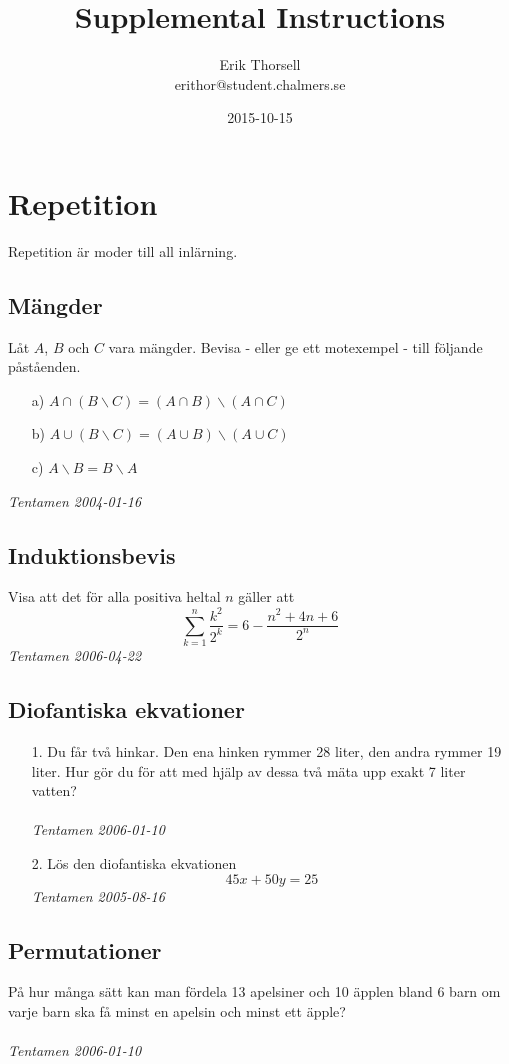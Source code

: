 \documentclass{article}
\title{Supplemental Instructions}
\author{Erik Thorsell \\ 
		\small{erithor@student.chalmers.se}
}
\date{2015-10-15}
\begin{document}
\maketitle


\section*{Repetition}
Repetition är moder till all inlärning.

\subsection*{Mängder}
Låt $A$, $B$ och $C$ vara mängder. Bevisa - eller ge ett motexempel - till 
följande påståenden.
\begin{itemize}
\item[a)] $A \cap (B \backslash C) = (A \cap B) \backslash (A \cap C)$
\item[b)] $A \cup (B \backslash C) = (A \cup B) \backslash (A \cup C)$
\item[c)] $A \backslash B = B \backslash A$
\end{itemize}
{\it Tentamen 2004-01-16}

\subsection*{Induktionsbevis}
Visa att det för alla positiva heltal $n$ gäller att 
$$\sum_{k=1}^{n} \frac{k^2}{2^k} = 6 - \frac{n^2+4n+6}{2^n}$$
{\it Tentamen 2006-04-22}


\subsection*{Diofantiska ekvationer}
\begin{itemize}
\item[1.] 
Du får två hinkar. Den ena hinken rymmer 28 liter, den andra rymmer 19 liter.
Hur gör du för att med hjälp av dessa två mäta upp exakt 7 liter vatten?\\
\\
{\it Tentamen 2006-01-10}

\item[2.]
Lös den diofantiska ekvationen $$45x+50y=25$$
{\it Tentamen 2005-08-16}
\end{itemize}

\subsection*{Permutationer}
På hur många sätt kan man fördela 13 apelsiner och 10 äpplen bland 6 barn 
om varje barn ska få minst en apelsin och minst ett äpple?\\
\\
{\it Tentamen 2006-01-10}
\end{document}
